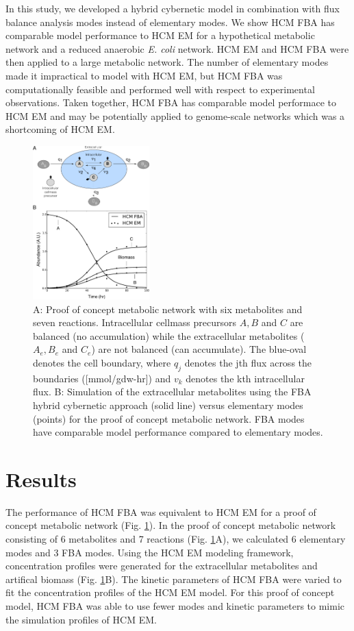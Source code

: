\documentclass[10pt,twocolumn,twoside,final]{IEEEtran}
\begin{document}
In this study, we developed a hybrid cybernetic model in combination with flux balance analysis modes instead of elementary modes.
We show HCM FBA has comparable model performance to HCM EM for a hypothetical metabolic network and a reduced anaerobic \textit{E. coli} network.
HCM EM and HCM FBA were then applied to a large metabolic network. 
The number of elementary modes made it impractical to model with HCM EM, but HCM FBA was computationally feasible and performed well with respect to experimental observations.
Taken together, HCM FBA has comparable model performace to HCM EM and may be potentially applied to genome-scale networks which was a shortcoming of HCM EM.


\begin{figure}[!t]\centering
\includegraphics[width=0.40\textwidth]{./figs/Fig-1-GeneralModel-Results.pdf}
\caption{A: Proof of concept metabolic network with six metabolites and seven reactions.
Intracellular cellmass precursors $A,B$ and $C$ are balanced (no accumulation) while the extracellular metabolites ($A_{e},B_{e}$ and $C_{e}$) are not balanced (can accumulate). The blue-oval denotes the cell boundary, where $q_{j}$ denotes the jth flux across the boundaries ([mmol/gdw-hr]) and $v_{k}$ denotes the kth intracellular flux. B: Simulation of the extracellular metabolites using the FBA hybrid cybernetic approach (solid line) versus elementary modes (points) for the proof of concept metabolic network. FBA modes have comparable model performance compared to elementary modes.
}\label{fig:model-fitting}
\end{figure}

\section{Results}
The performance of HCM FBA was equivalent to HCM EM for a proof of concept metabolic network (Fig. \ref{fig:model-fitting}).
In the proof of concept metabolic network consisting of 6 metabolites and 7 reactions (Fig. \ref{fig:model-fitting}A), we calculated 6 elementary modes and 3 FBA modes.
Using the HCM EM modeling framework, concentration profiles were generated for the extracellular metabolites and artifical biomass (Fig. \ref {fig:model-fitting}B).
The kinetic parameters of HCM FBA were varied to fit the concentration profiles of the HCM EM model.
For this proof of concept model, HCM FBA was able to use fewer modes and kinetic parameters to mimic the simulation profiles of HCM EM.
\end{document}
